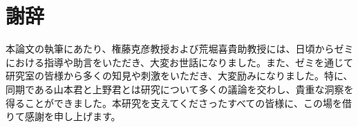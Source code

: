 \section{謝辞}
本論文の執筆にあたり、権藤克彦教授および荒堀喜貴助教授には、日頃からゼミにおける指導や助言をいただき、大変お世話になりました。また、ゼミを通じて研究室の皆様から多くの知見や刺激をいただき、大変励みになりました。特に、同期である山本君と上野君とは研究について多くの議論を交わし、貴重な洞察を得ることができました。本研究を支えてくださったすべての皆様に、この場を借りて感謝を申し上げます。\par


